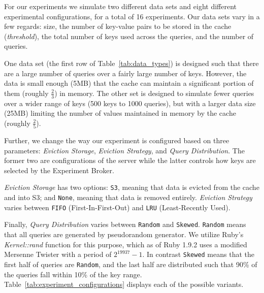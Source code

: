 For our experiments we simulate two different data sets and eight different
experimental configurations, for a total of 16 experiments. Our data sets vary
in a few regards: size, the number of key-value pairs to be stored in the cache
(\emph{threshold}), the total number of keys used across the queries, and the
number of queries.

One data set (the first row of Table~\ref{tab:data_types}) is designed such
that there are a large number of queries over a fairly large number of keys.
However, the data is small enough (5MB) that the cache can maintain a
significant portion of them (roughly $\frac{2}{3}$) in memory. The other set is
designed to simulate fewer queries over a wider range of keys (500 keys to 1000
queries), but with a larger data size (25MB) limiting the number of values
maintained in memory by the cache (roughly $\frac{2}{5}$).

Further, we change the way our experiment is configured based on three
parameters: \emph{Eviction Storage}, \emph{Eviction Strategy}, and \emph{Query
Distribution}. The former two are configurations of the server while the latter
controls how keys are selected by the Experiment Broker.

\emph{Eviction Storage} has two options: {\tt S3}, meaning that data is evicted
from the cache and into S3; and {\tt None}, meaning that data is removed
entirely. \emph{Eviction Strategy} varies between {\tt FIFO}
(First-In-First-Out) and {\tt LRU} (Least-Recently Used). 

Finally, \emph{Query Distribution} varies between {\tt Random} and {\tt Skewed}.
{\tt Random} means that all queries are generated by pseudorandom generator.
We utilize Ruby's \emph{Kernel::rand} function for this purpose, which as of
Ruby 1.9.2 uses a modified Mersenne Twister with a period of
$2^{19937}-1$\cite{ruby_rand}. In contrast {\tt Skewed} means that the first
half of queries are {\tt Random}, and the last half are distributed such that
90\% of the queries fall within 10\% of the key range.
Table~\ref{tab:experiment_configurations} displays each of the possible
variants.

